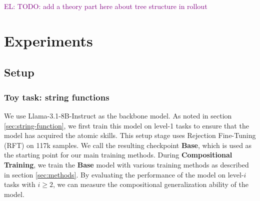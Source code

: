 \documentclass{article}
\newcommand{\el}[1]{\textcolor{purple}{EL: #1}}
\begin{document}

\el{TODO: add a theory part here about tree structure in rollout}

\section{Experiments}
\label{sec:experiments}
\subsection{Setup}
\subsubsection{Toy task: string functions}
We use Llama-3.1-8B-Instruct as the backbone model. As noted in section \ref{sec:string-function}, we first train this model on level-1 tasks to ensure that the model has acquired the atomic skills. This setup stage uses Rejection Fine-Tuning (RFT) on 117k samples. We call the resulting checkpoint \textbf{Base}, which is used as the starting point for our main training methods.
During \textbf{Compositional Training}, we train the \textbf{Base} model with various training methods as described in section \ref{sec:methods}. By evaluating the performance of the model on level-$i$ tasks with $i \ge 2$, we can measure the compositional generalization ability of the model.

\end{document}
